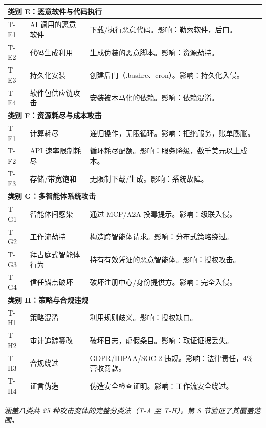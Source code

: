 {\begin{tabular}{|l|p{3cm}|p{12.8cm}|}
\hline
\multicolumn{3}{|l|}{\textbf{类别 E：恶意软件与代码执行}} \\
\hline
T-E1 & AI 调用的恶意软件 & 下载/执行恶意代码。影响：勒索软件，后门。 \\
T-E2 & 代码生成利用 & 生成伪装的恶意脚本。影响：资源劫持。 \\
T-E3 & 持久化安装 & 创建后门（.bashrc、cron）。影响：持久化入侵。 \\
T-E4 & 软件包供应链攻击 & 安装被木马化的依赖。影响：依赖混淆。 \\
\hline
\multicolumn{3}{|l|}{\textbf{类别 F：资源耗尽与成本攻击}} \\
\hline
T-F1 & 计算耗尽 & 递归操作，无限循环。影响：拒绝服务，账单膨胀。 \\
T-F2 & API 速率限制耗尽 & 循环耗尽配额。影响：服务降级，数千美元以上成本。 \\
T-F3 & 存储/带宽饱和 & 无限制下载/生成。影响：系统故障。 \\
\hline
\multicolumn{3}{|l|}{\textbf{类别 G：多智能体系统攻击}} \\
\hline
T-G1 & 智能体间感染 & 通过 MCP/A2A 投毒提示。影响：级联入侵。 \\
T-G2 & 工作流劫持 & 构造跨智能体请求。影响：分布式策略绕过。 \\
T-G3 & 拜占庭式智能体行为 & 持有有效凭证的恶意智能体。影响：授权攻击。 \\
T-G4 & 信任锚点破坏 & 破坏注册中心/身份提供方。影响：完全入侵。 \\
\hline
\multicolumn{3}{|l|}{\textbf{类别 H：策略与合规违规}} \\
\hline
T-H1 & 策略混淆 & 利用规则歧义。影响：授权缺口。 \\
T-H2 & 审计追踪篡改 & 破坏日志，虚假条目。影响：取证证据丢失。 \\
T-H3 & 合规绕过 & GDPR/HIPAA/SOC 2 违规。影响：法律责任，4\%营收罚款。 \\
T-H4 & 证言伪造 & 伪造安全检查证明。影响：工作流安全绕过。 \\
\hline
\end{tabular}

\vspace{2mm}
\noindent\textit{涵盖八类共 25 种攻击变体的完整分类法（T-A 至 T-H）。第 8 节验证了其覆盖范围。}
}
